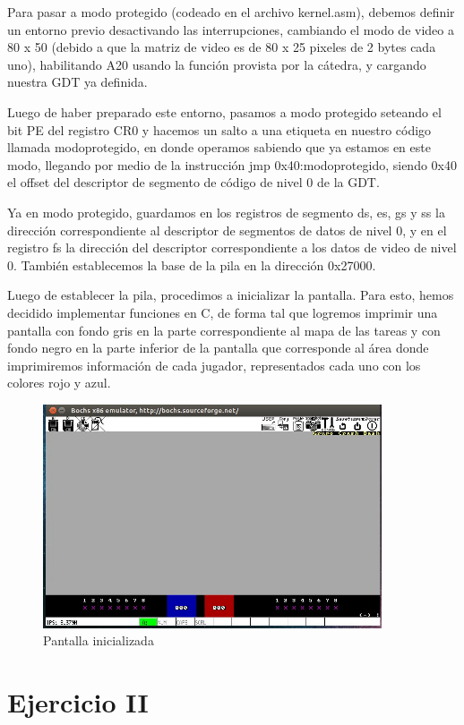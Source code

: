 \documentclass[a4paper]{article}
\begin{document}
Para pasar a modo protegido (codeado en el archivo kernel.asm), debemos definir un entorno previo desactivando las interrupciones, cambiando el modo de video a 80 x 50 (debido a que la matriz de video es de 80 x 25 pixeles de 2 bytes cada uno), habilitando A20 usando la función provista por la cátedra, y cargando nuestra GDT ya definida.

Luego de haber preparado este entorno, pasamos a modo protegido seteando el bit PE del registro CR0 y hacemos un salto a una etiqueta en nuestro código llamada modoprotegido, en donde operamos sabiendo que ya estamos en este modo, llegando por medio de la instrucción jmp 0x40:modoprotegido, siendo 0x40 el offset del descriptor de segmento de código de nivel 0 de la GDT.


Ya en modo protegido, guardamos en los registros de segmento ds, es, gs y ss la dirección correspondiente al descriptor de segmentos de datos de nivel 0, y en el registro fs la dirección del descriptor correspondiente a los datos de video de nivel 0. También establecemos la base de la pila en la dirección 0x27000.

Luego de establecer la pila, procedimos a inicializar la pantalla. Para esto, hemos decidido implementar funciones en C, de forma tal que logremos imprimir una pantalla con fondo gris en la parte correspondiente al mapa de las tareas y con fondo negro en la parte inferior de la pantalla que corresponde al área donde imprimiremos información de cada jugador, representados cada uno con los colores rojo y azul.



\begin{figure}[ht!]
\centering
\includegraphics[width=100mm]{imagenes/imagenbochs.png}
\caption {Pantalla inicializada}
\end{figure}


\newpage

\section{Ejercicio II}
\end{document}
